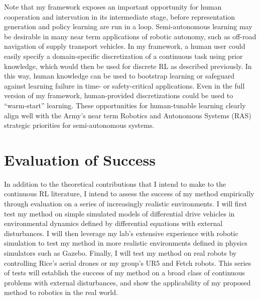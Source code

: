 \documentclass[10pt]{article}
\begin{document}
Note that my framework exposes an important opportunity for human cooperation
and intervation in its intermediate stage, before representation generation and
policy learning are run in a loop. Semi-autonomous learning may be desirable in
many near term applications of robotic autonomy, such as off-road navigation of
supply transport vehicles. In my framework, a human user could easily specify a
domain-specific discretization of a continuous task using prior knowledge,
which would then be used for discrete RL as described previously. In this way, human
knowledge can be used to bootstrap learning or safeguard against learning
failure in time- or safety-critical applications. Even in the full version of my
framework, human-provided discretizations could be used to ``warm-start''
learning. These opportunities for human-tunable learning clearly align well with
the Army's near term Robotics and Autonomous Systems (RAS) strategic
priorities for semi-autonomous systems.

\section*{Evaluation of Success}
In addition to the theoretical contributions that I intend to make to the
continuous RL literature, I intend to assess the success of my method
empirically through evaluation on a series of increasingly realistic
environments. I will first test my method on simple simulated models of
differential drive vehicles in environmental dynamics defined by differential
equations with external disturbances. I will then leverage my lab's extensive
experience with robotic simulation to test my method in more realistic
environments defined in physics simulators such as Gazebo. Finally, I will test
my method on real robots by controlling Rice's aerial drones or my group's UR5
and Fetch robots. This series of tests will establish the success of my method
on a broad class of continuous problems with external disturbances, and show
the applicability of my proposed method to robotics in the real world.
\end{document}

